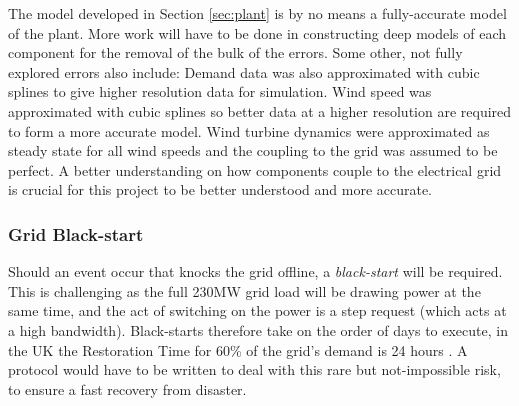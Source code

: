 The model developed in Section \ref{sec:plant} is by no means a fully-accurate model of the plant.
More work will have to be done in constructing deep models of each component for the removal of the bulk of the errors.
Some other, not fully explored errors also include:
Demand data was also approximated with cubic splines to give higher resolution data for simulation.
Wind speed was approximated with cubic splines so better data at a higher resolution are required to form a more accurate model.
Wind turbine dynamics were approximated as steady state for all wind speeds and the coupling to the grid was assumed to be perfect.
A better understanding on how components couple to the electrical grid is crucial for this project to be better understood and more accurate.

\subsubsection{Grid Black-start}
\label{sec:challengespwr}

Should an event occur that knocks the grid offline, a \emph{black-start} will be required.
This is challenging as the full 230MW grid load will be drawing power at the same time, and the act of switching on the power is a step request (which acts at a high bandwidth).
Black-starts therefore take on the order of days to execute, in the UK the Restoration Time for 60\% of the grid's demand is 24 hours \cite{power:natgridblack}.
A protocol would have to be written to deal with this rare but not-impossible risk, to ensure a fast recovery from disaster.
